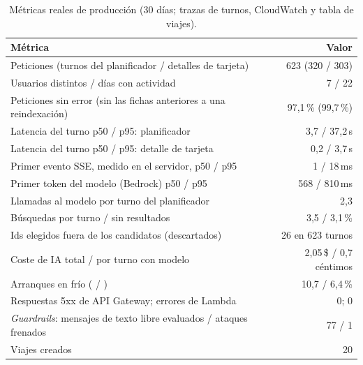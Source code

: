 \begin{table}[h]
\centering\scriptsize
\caption{Métricas reales de producción (30 días; trazas de turnos, CloudWatch y tabla de viajes).}\label{tab:produccion}
\begin{tabularx}{\columnwidth}{@{}Yr@{}}
\toprule
\textbf{Métrica} & \textbf{Valor} \\
\midrule
Peticiones (turnos del planificador / detalles de tarjeta) & 623 (320 / 303) \\
Usuarios distintos / días con actividad & 7 / 22 \\
Peticiones sin error (sin las fichas anteriores a una reindexación) & 97,1\,\% (99,7\,\%) \\
Latencia del turno p50 / p95: planificador & 3,7 / 37,2\,s \\
Latencia del turno p50 / p95: detalle de tarjeta & 0,2 / 3,7\,s \\
Primer evento SSE, medido en el servidor, p50 / p95 & 1 / 18\,ms \\
Primer token del modelo (Bedrock) p50 / p95 & 568 / 810\,ms \\
Llamadas al modelo por turno del planificador & 2,3 \\
Búsquedas por turno / sin resultados & 3,5 / 3,1\,\% \\
Ids elegidos fuera de los candidatos (descartados) & 26 en 623 turnos \\
Coste de IA total / por turno con modelo & 2,05\,\$ / 0,7 céntimos \\
Arranques en frío ( / ) & 10,7 / 6,4\,\% \\
Respuestas 5xx de API Gateway; errores de Lambda & 0; 0 \\
\emph{Guardrails}: mensajes de texto libre evaluados / ataques frenados & 77 / 1 \\
Viajes creados & 20 \\
\bottomrule
\end{tabularx}
\end{table}
